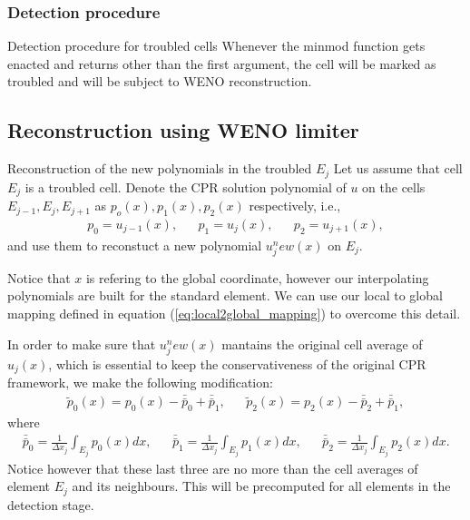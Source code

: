 \begin{frame} \frametitle{Detection procedure}
	
	\begin{block}{Detection procedure for troubled cells}
	Whenever the minmod function gets enacted and returns other than the first argument, the cell will be marked as troubled and will be subject to WENO reconstruction.
	\end{block}
\end{frame}

\subsection{Reconstruction using WENO limiter}
\begin{frame}{Reconstruction of the new polynomials in the troubled $E_j$}
	Let us assume that cell $E_j$ is a troubled cell. Denote the CPR solution polynomial of $u$ on the cells $E_{j-1},E_j,E_{j+1}$ as $p_o(x),p_1(x),p_2(x)$ respectively, i.e.,
	\begin{align}
	&p_0 = u_{j-1}(x),& &p_1 = u_{j}(x),& &p_2 = u_{j+1}(x),&
	\end{align}
	and use them to reconstuct a new polynomial $u_j^new(x)$ on $E_j$. 
	\begin{block}
	Notice that $x$ is refering to the global coordinate, however our interpolating polynomials are built for the standard element. We can use our local to global mapping defined in equation (\ref{eq:local2global_mapping}) to overcome this detail.
	\end{block}
\end{frame}

\begin{frame}
	In order to make sure that $u_j^new(x)$ mantains the original cell average of $u_j(x)$, which is essential to keep the conservativeness of the original CPR framework, we make the following modification:
	\begin{align}
	&\tilde{p}_0(x) = p_0(x)-\bar{\bar{p}}_0+\bar{\bar{p}}_1,&
	&\tilde{p}_2(x) = p_2(x)-\bar{\bar{p}}_2+\bar{\bar{p}}_1,&
	\label{eq:MODneighbours}
	\end{align}
where 
	\begin{align}
	&\bar{\bar{p}}_0 = \frac{1}{\Delta x_j}\int_{E_j} p_0(x)dx,&
	&\bar{\bar{p}}_1 = \frac{1}{\Delta x_j}\int_{E_j} p_1(x)dx,&	
	&\bar{\bar{p}}_2 = \frac{1}{\Delta x_j}\int_{E_j} p_2(x)dx.&
	\end{align}
	Notice however that these last three are no more than the cell averages of element $E_j$ and its neighbours. This will be precomputed for all elements in the detection stage.
\end{frame}

